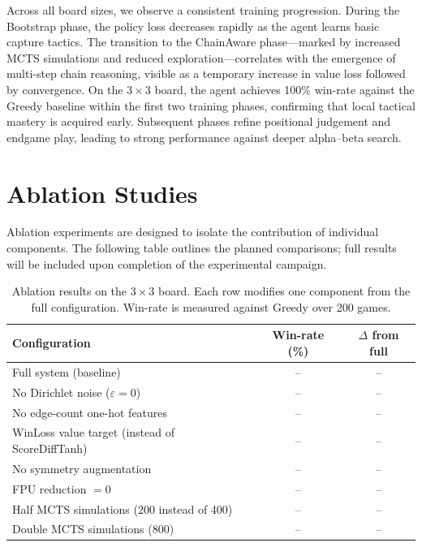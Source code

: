 \documentclass[11pt]{article}
\begin{document}
Across all board sizes, we observe a consistent training progression.
During the Bootstrap phase, the policy loss decreases rapidly as the
agent learns basic capture tactics. The transition to the ChainAware
phase---marked by increased MCTS simulations and reduced
exploration---correlates with the emergence of multi-step chain
reasoning, visible as a temporary increase in value loss followed by
convergence. On the $3{\times}3$ board, the agent achieves 100\%
win-rate against the Greedy baseline within the first two training
phases, confirming that local tactical mastery is acquired early.
Subsequent phases refine positional judgement and endgame play,
leading to strong performance against deeper alpha--beta search.

\section{Ablation Studies}
\label{sec:ablations}

Ablation experiments are designed to isolate the contribution of individual
components. The following table outlines the planned comparisons; full
results will be included upon completion of the experimental campaign.

\begin{table}[t]
\centering
\caption{Ablation results on the $3{\times}3$ board. Each row modifies one
component from the full configuration. Win-rate is measured against Greedy
over 200 games.}
\label{tab:ablations}
\begin{tabular}{lcc}
\toprule
Configuration & Win-rate (\%) & $\Delta$ from full \\
\midrule
Full system (baseline)              & -- & -- \\
No Dirichlet noise ($\varepsilon=0$)                 & -- & -- \\
No edge-count one-hot features                        & -- & -- \\
WinLoss value target (instead of ScoreDiffTanh)       & -- & -- \\
No symmetry augmentation                              & -- & -- \\
FPU reduction $= 0$                                    & -- & -- \\
Half MCTS simulations (200 instead of 400)            & -- & -- \\
Double MCTS simulations (800)                         & -- & -- \\
\bottomrule
\end{tabular}
\end{table}
\end{document}
